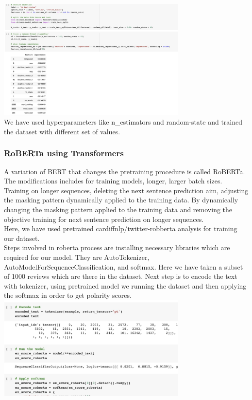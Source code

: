 \includegraphics[width=9.5cm, height=8cm \textwidth]{rf.jpeg}\\

We have used hyperparameters like n\_estimators and random-state and trained the dataset with different set of values.

\subsubsection{RoBERTa using Transformers}
A variation of BERT that changes the pretraining procedure is called RoBERTa. The modifications includes for training models, longer, larger batch sizes. Training on longer sequences, deleting the next sentence prediction aim, adjusting the masking pattern dynamically applied to the training data.
By dynamically changing the masking pattern applied to the training data and removing the objective training for next sentence prediction on longer sequences.\\
Here, we have used pretrained cardiffnlp/twitter-robberta analysis for training our dataset.\\
Steps involved in roberta process are installing necessary libraries which are required for our model. They are AutoTokenizer, AutoModelForSequenceClassification, and softmax. Here we have taken a subset of 1000 reviews which are there in the dataset. Next step is to encode the text with tokenizer, using pretrained model we running the dataset and then applying the softmax in order to get polarity scores.
\includegraphics[width=9.5cm, height=8cm \textwidth]{encode.jpeg}\\

